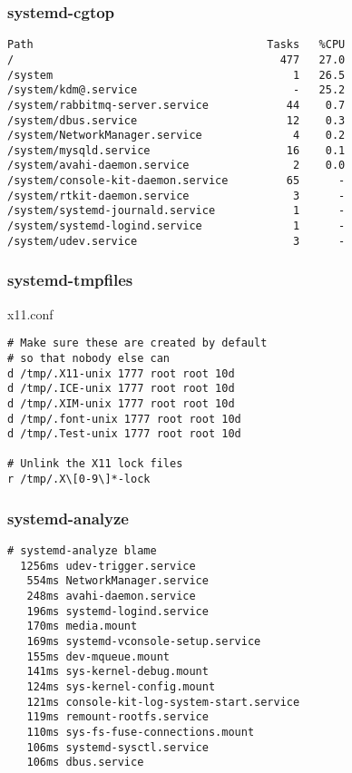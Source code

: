 \documentclass{beamer}
\begin{document}
\begin{frame}[fragile]
    \frametitle{systemd-cgtop}
    \begin{verbatim}
Path                                    Tasks   %CPU
/                                         477   27.0
/system                                     1   26.5
/system/kdm@.service                        -   25.2
/system/rabbitmq-server.service            44    0.7
/system/dbus.service                       12    0.3
/system/NetworkManager.service              4    0.2
/system/mysqld.service                     16    0.1
/system/avahi-daemon.service                2    0.0
/system/console-kit-daemon.service         65      -
/system/rtkit-daemon.service                3      -
/system/systemd-journald.service            1      -
/system/systemd-logind.service              1      -
/system/udev.service                        3      -
    \end{verbatim}
\end{frame}

\begin{frame}[fragile]
    \frametitle{systemd-tmpfiles}
    \begin{block}{x11.conf}
    \begin{verbatim}
# Make sure these are created by default
# so that nobody else can
d /tmp/.X11-unix 1777 root root 10d
d /tmp/.ICE-unix 1777 root root 10d
d /tmp/.XIM-unix 1777 root root 10d
d /tmp/.font-unix 1777 root root 10d
d /tmp/.Test-unix 1777 root root 10d

# Unlink the X11 lock files
r /tmp/.X\[0-9\]*-lock
    \end{verbatim}
    \end{block}
\end{frame}

\begin{frame}[fragile]
    \frametitle{systemd-analyze}
    \begin{verbatim}
# systemd-analyze blame
  1256ms udev-trigger.service
   554ms NetworkManager.service
   248ms avahi-daemon.service
   196ms systemd-logind.service
   170ms media.mount
   169ms systemd-vconsole-setup.service
   155ms dev-mqueue.mount
   141ms sys-kernel-debug.mount
   124ms sys-kernel-config.mount
   121ms console-kit-log-system-start.service
   119ms remount-rootfs.service
   110ms sys-fs-fuse-connections.mount
   106ms systemd-sysctl.service
   106ms dbus.service
    \end{verbatim}
\end{frame}
\end{document}
